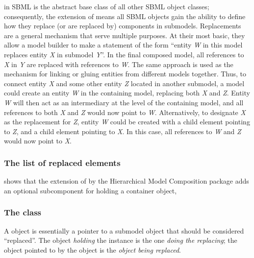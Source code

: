 \SBase in SBML is the abstract base class of all other SBML object classes; consequently, the extension of \SBase means all SBML objects gain the ability to define how they replace (or are replaced by) components in submodels. Replacements are a general mechanism that serve multiple purposes.  At their most basic, they allow a model builder to make a statement of the form ``entity \emph{W} in this model replaces entity \emph{X} in submodel \emph{Y}''.  In the final composed model, all references to \emph{X} in \emph{Y} are replaced with references to \emph{W}.  The same approach is used as the mechanism for linking or gluing entities from different models together.  Thus, to connect entity \emph{X} and some other entity \emph{Z} located in another submodel, a model could create  an entity \emph{W} in the containing model, replacing both \emph{X} and \emph{Z}.  Entity \emph{W} will then act as an intermediary at the level of the containing model, and all references to both \emph{X} and \emph{Z} would now point to \emph{W}.  Alternatively, to designate \emph{X} as the replacement for \emph{Z}, entity \emph{W} could be created with a child \ReplacedElement element pointing to \emph{Z}, and a child \ReplacedBy element pointing to \emph{X}.  In this case, all references to \emph{W} and \emph{Z} would now point to \emph{X}.


\subsubsection{The list of replaced elements}

 shows that the extension of \SBase by the Hierarchical Model Composition package adds an optional  subcomponent for holding a \ListOfReplacedElements container object, 


\subsubsection{The  class}
\label{replacedelement-class}
\label{listofreplacedelements-class}

A \ReplacedElement object is essentially a pointer to a submodel object that should be considered ``replaced''.  The object \emph{holding} the \ReplacedElement instance is the one \emph{doing the replacing}; the object pointed to by the \ReplacedElement object is the \emph{object   being replaced}.

